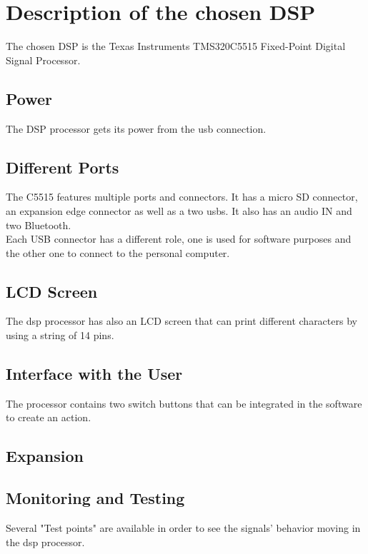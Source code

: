 \section{Description of the chosen DSP}

The chosen DSP is the Texas Instruments TMS320C5515 Fixed-Point Digital Signal Processor.

\subsection{Power}

The DSP processor gets its power from the \gls{usb} connection.

\subsection{Different Ports}

The C5515 features multiple ports and connectors. It has a micro SD connector, an expansion edge connector as well as a two \gls{usb}s. It also has an audio IN and two Bluetooth. \\

Each USB connector has a different role, one is used for software purposes and the other one to connect to the personal computer. 

\subsection{LCD Screen}

The \gls{dsp} processor has also an LCD screen that can print different characters by using a string of 14 pins. 

\subsection{Interface with the User}

The processor contains two switch buttons that can be integrated in the software to create an action. 

\subsection{Expansion}

\subsection{Monitoring and Testing}

Several "Test points" are available in order to see the signals' behavior moving in the \gls{dsp} processor.